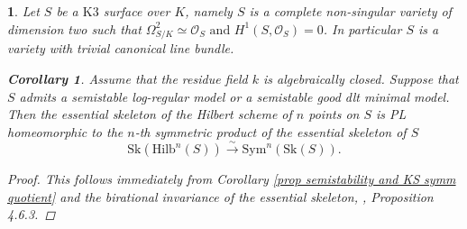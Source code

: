 \documentclass{amsart}%
\numberwithin{equation}{subsection}
\theoremstyle{plain2}
\newtheorem{cor}[equation]{Corollary}
\theoremstyle{definition2}
\theoremstyle{stepstyle}
\theoremstyle{point}
\theoremstyle{subpoint}
\newtheorem{subpoint}[equation]{}%
\newcommand{\spa}[1]{\begin{subpoint}#1\end{subpoint}}           %
\newcommand{\caO}{\ensuremath{\mathcal{O}}}
\newcommand{\Hilb}{\ensuremath{\mathrm{Hilb}}}
\newcommand{\Sk}{\mathrm{Sk}}
\begin{document}
\spa{Let $S$ be a $\text{K}3$ surface over $K$, namely $S$ is a complete non-singular variety of dimension two such that $\Omega_{S/K}^2 \simeq \caO_S \text{ and } H^1(S,\caO_S) = 0$. In particular $S$ is a variety with trivial canonical line bundle. 
\begin{cor}  \label{cor essential skeleton hilb}
Assume that the residue field $k$ is algebraically closed. Suppose that $S$ admits a semistable log-regular model or a semistable good dlt minimal model. Then the essential skeleton of the Hilbert scheme of $n$ points on $S$ is PL homeomorphic to the $n$-th symmetric product of the essential skeleton of $S$ $$\Sk(\Hilb^n(S)) \xrightarrow{\sim} \text{Sym}^n(\Sk(S)).$$ 
\end{cor}
\begin{proof}
This follows immediately from Corollary \ref{prop semistability and KS symm quotient} and the birational invariance of the essential skeleton, \cite{MustataNicaise}, Proposition 4.6.3.

\end{proof}}
\end{document}
